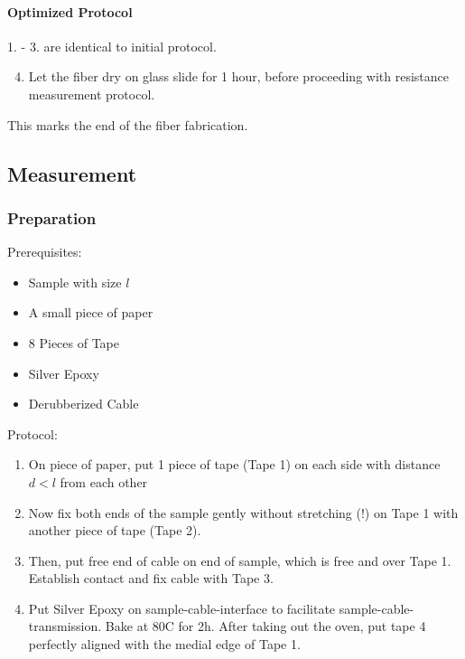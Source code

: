 \paragraph{Optimized Protocol} \hfill\newline

1. - 3. are identical to initial protocol.

\begin{enumerate}
\setcounter{enumi}{3}
	
	\item Let the fiber dry on glass slide for 1 hour, before proceeding with resistance measurement protocol.


\end{enumerate}
    
    \begin{center}
        This marks the end of the fiber fabrication.
    \end{center}

\subsection{Measurement}

\subsubsection{Preparation}
Prerequisites:
\begin{multicols}{2}
\begin{itemize}
    \item Sample with size $l$
    \item A small piece of paper
    \item 8 Pieces of Tape
    \item Silver Epoxy
    \item Derubberized Cable
\end{itemize}
\end{multicols}

Protocol:

\begin{enumerate}
	
    \item On piece of paper, put 1 piece of tape (Tape 1) on each side with distance $d < l$ from each other
    
    \item Now fix both ends of the sample gently without stretching (!) on Tape 1 with another piece of tape (Tape 2).
    
    \item Then, put free end of cable on end of sample, which is free and over Tape 1. Establish contact and fix cable with Tape 3.
    
    \item Put Silver Epoxy on sample-cable-interface to facilitate sample-cable-transmission. Bake at 80\textdegree C for 2h. After taking out the oven, put tape 4 perfectly aligned with the medial edge of Tape 1.
\end{enumerate}


